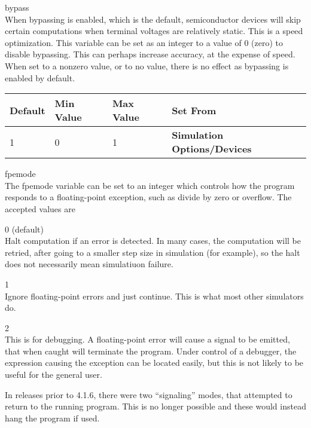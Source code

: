 \begin{description}
\item{\et bypass}\\
When bypassing is enabled, which is the default, semiconductor devices
will skip certain computations when terminal voltages are relatively
static.  This is a speed optimization.  This variable can be set as an
integer to a value of 0 (zero) to disable bypassing.  This can perhaps
increase accuracy, at the expense of speed.  When set to a nonzero
value, or to no value, there is no effect as bypassing is enabled by
default.

\begin{tabular}{|l|l|l|l|}\hline
\bf Default & \bf Min Value & \bf Max Value & \bf Set From\\ \hline
1 & 0 & 1 & \bf Simulation Options/Devices\\ \hline
\end{tabular}

\item{\et fpemode}\\
The {\et fpemode} variable can be set to an integer which controls how
the program responds to a floating-point exception, such as divide by
zero or overflow.  The accepted values are

\begin{description}
\item{0 (default)}\\
Halt computation if an error is detected.  In many cases, the
computation will be retried, after going to a smaller step size in
simulation (for example), so the halt does not necessarily mean
simulatiuon failure.

\item{1}\\
Ignore floating-point errors and just continue.  This is what most
other simulators do.

\item{2}\\
This is for debugging.  A floating-point error will cause a signal
to be emitted, that when caught will terminate the program.  Under
control of a debugger, the expression causing the exception can be
located easily, but this is not likely to be useful for the
general user.
\end{description}

In releases prior to 4.1.6, there were two ``signaling'' modes, that
attempted to return to the running program.  This is no longer
possible and these would instead hang the program if used.


\end{description}
